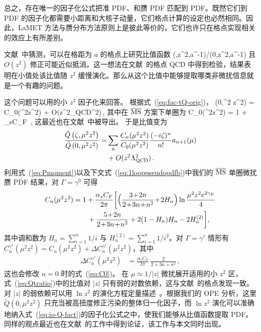 总之，存在唯一的因子化公式把准 PDF、\spcorr 和赝 PDF 匹配到 PDF。既然它们到 PDF 的因子化都需要小距离和大核子动量，它们格点计算的设定也必然相同。因此，LaMET 方法与赝分布方法原则上是彼此等价的，它们也许只在格点实现相关的效应上有所差别。

文献~\cite{Radyushkin:2017cyf}中猜测，可以在格距为 $a$ 的格点上研究比值函数
\beq \label{eq:ratio}
(\zeta,z^2,a^{-1})/(0,z^2,a^{-1})
\eeq
且 $O(z^2)$ 修正可能近似抵消。这一想法在文献~\cite{Orginos:2017kos}的格点 QCD 中得到检验，结果表明在小值处该比值随 $z^2$ 缓慢演化。那么从这个比值中能够提取哪类非微扰信息就是一个有趣的问题。

这个问题可以用\spcorr 的小 $z^2$ 因子化来回答。
根据式~(\ref{eq:fac-tQ-orig})，
\beq
	(0,\mu^2 z^2) = C_0(\mu^2z^2) + O(z^2\Lambda_{\rm QCD}^2)\,,
\eeq
其中在 $\overline{\rm MS}$ 方案下单圈为
\beq  \label{eq:C0}
	C_0(\mu^2z^2) = 1 + {\alpha_sC_F\pi}  \,,
\eeq
这最近也在文献~\cite{Zhang:2018ggy}中被导出。
于是比值变为
\begin{align} \label{eq:Qtratio}
	\frac{\tilde{Q}\left(\zeta, {\mu}^2 z^2\right)}{\tilde{Q}\left(0, {\mu}^2 z^2\right)}
	=&\sum_n \frac{C_n (\mu^2z^2)}{C_0 (\mu^2z^2)}	\frac{(-i \zeta)^n}{n!} a_{n+1}(\mu)\\
	&+ O(z^2\Lambda_{\rm QCD}^2)\,.\nonumber
\end{align}
利用式~(\ref{eq:Pmoment})以及下文式~(\ref{eq:1looppseudopdfb})中我们的 $\overline{\rm MS}$ 单圈微扰赝 PDF 结果，对 $\Gamma=\gamma^0$ 可得
\begin{align}
  C_n(\mu^2 z^2) &= 1 +\frac{\alpha_s C_F}{2\pi} \biggl[ \Bigl(
  \frac{3\!+\!2n}{2\!+\!3n\!+\!n^2}
  \!+\! 2H_n\Bigr) \ln\frac{\mu^2z^2 e^{2\gamma_E}}{4}
  \nn\\
 &\quad\quad
  +   \frac{5\!+\!2n}{2\!+\!3n\!+\!n^2}+2(1-H_n)H_n - 2 H_n^{(2)}
  \biggr] ,
\end{align}
其中调和数为 $H_n=\sum_{i=1}^n 1/i$ 与 $H_n^{(2)} =\sum_{i=1}^n 1/i^2$。对 $\Gamma=\gamma^z$ 情形有 $C_n^{\gamma^z}(\mu^2 z^2) = C_n(\mu^2 z^2) + \Delta C_n^{\gamma^z}(\mu^2 z^2)$，其中
\begin{align}
  \Delta C_n^{\gamma^z}(\mu^2 z^2)
   &= \frac{\alpha_s C_F}{2\pi} \: \frac{2}{2\!+\!3n\!+\!n^2} \,,
\end{align}
这也会修改 $n=0$ 时的式~(\ref{eq:C0})。
在 $\mu\simeq 1/|z|$ 微扰展开适用的小 $z^2$ 区，式~(\ref{eq:Qtratio})中的比值对 $|z|$ 只有弱的对数依赖，这与文献~\cite{Orginos:2017kos,Karpie:2017bzm}的格点发现一致。对 $|z|$ 的弱依赖可以用 $\ln z^2$ 的演化方程定量描述~\cite{Radyushkin:2017cyf,Radyushkin:2017lvu}。根据我们的 OPE 分析，这里 $\tilde{Q}(0,\mu^2 z^2)$ 只充当被高扭度修正污染的整体归一化因子，而 $\ln z^2$ 演化可以准确地纳入式~(\ref{eq:io-Q-fact})的因子化公式之中，使我们能够从比值函数提取 PDF。同样的观点最近也在文献~\cite{Zhang:2018ggy}的工作中得到论证，该工作与本文同时出现。
